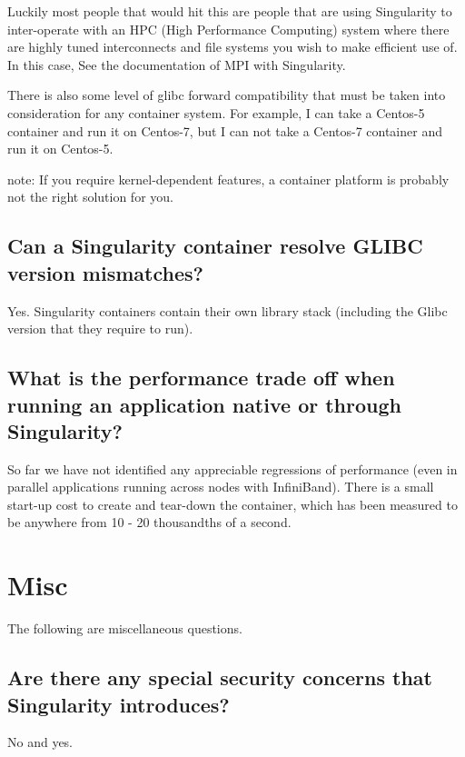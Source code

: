 \documentclass[letterpaper,10pt,english]{sphinxmanual}
\begin{document}
Luckily most people that would hit this are people that are using Singularity to inter-operate with an HPC (High Performance Computing) system where there are highly tuned interconnects and file systems you wish to make efficient use of. In this case, See the documentation of MPI with Singularity.

There is also some level of glibc forward compatibility that must be taken into consideration for any container system. For example, I can take a Centos-5 container and run it on Centos-7, but I can not take a Centos-7 container and run it on Centos-5.

note: If you require kernel-dependent features, a container platform is probably not the right solution for you.


\subsection{Can a Singularity container resolve GLIBC version mismatches?}
\label{\detokenize{faq:can-a-singularity-container-resolve-glibc-version-mismatches}}
Yes. Singularity containers contain their own library stack (including the Glibc version that they require to run).


\subsection{What is the performance trade off when running an application native or through Singularity?}
\label{\detokenize{faq:what-is-the-performance-trade-off-when-running-an-application-native-or-through-singularity}}
So far we have not identified any appreciable regressions of performance (even in parallel applications running across nodes with InfiniBand).
There is a small start-up cost to create and tear-down the container, which has been measured to be anywhere from 10 - 20 thousandths of a second.


\section{Misc}
\label{\detokenize{faq:misc}}
The following are miscellaneous questions.


\subsection{Are there any special security concerns that Singularity introduces?}
\label{\detokenize{faq:are-there-any-special-security-concerns-that-singularity-introduces}}
No and yes.
\end{document}
